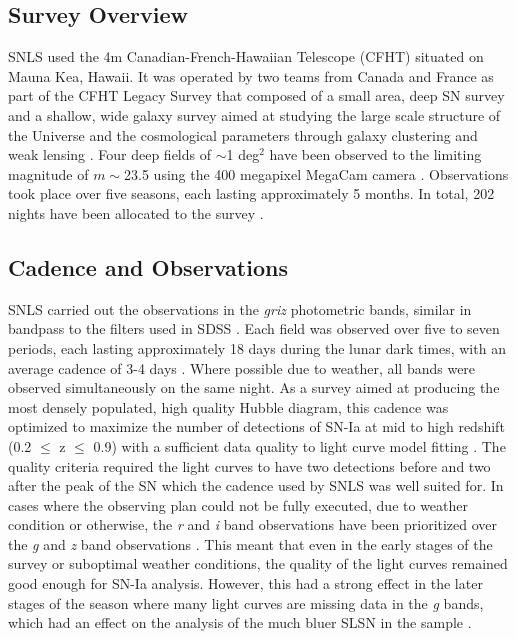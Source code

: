 \subsection{Survey Overview}
SNLS used the 4m Canadian-French-Hawaiian Telescope (CFHT) situated on Mauna Kea, Hawaii. It was operated by two teams from Canada and France as part of the CFHT Legacy Survey that composed of a small area, deep SN survey and a shallow, wide galaxy survey aimed at studying the large scale structure of the Universe and the cosmological parameters through galaxy clustering and weak lensing \citep{Pritchet2004,Astier2006}. Four deep fields of $\sim$1 deg$^2$ have been observed to the limiting magnitude of $m\sim$23.5 using the 400 megapixel MegaCam camera \citep{Boulade2003}. Observations took place over five seasons, each lasting approximately 5 months. In total, 202 nights have been allocated to the survey \citep{Pritchet2004}.

\subsection{Cadence and Observations}
SNLS carried out the observations in the \textit{griz} photometric bands, similar in bandpass to the filters used in SDSS . Each field was observed over five to seven periods, each lasting approximately 18 days during the lunar dark times, with an average cadence of 3-4 days \citep{Astier2006,Guy2010}. Where possible due to weather, all bands were observed simultaneously on the same night. As a survey aimed at producing the most densely populated, high quality Hubble diagram, this cadence was optimized to maximize the number of detections of SN-Ia at mid to high redshift (0.2 $\leq$ z $\leq$ 0.9) with a sufficient data quality to light curve model fitting \citep{Pritchet2004}. The quality criteria required the light curves to have two detections before and two after the peak of the SN which the cadence used by SNLS was well suited for. In cases where the observing plan could not be fully executed, due to weather condition or otherwise, the \textit{r} and \textit{i} band observations have been prioritized over the \textit{g} and \textit{z} band observations \citep{Guy2010}. This meant that even in the early stages of the survey or suboptimal weather conditions, the quality of the light curves remained good enough for SN-Ia analysis. However, this had a strong effect in the later stages of the season where many light curves are missing data in the \textit{g} bands, which had an effect on the analysis of the much bluer SLSN in the sample \citep{Prajs2016}.
% 
% 

